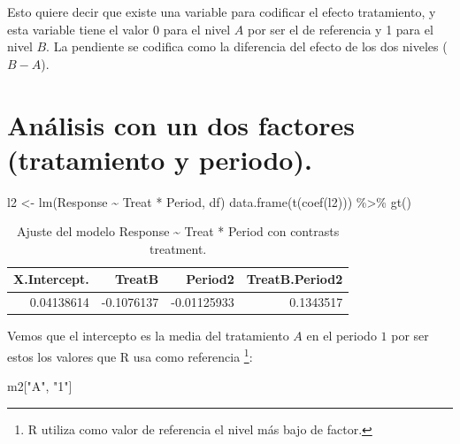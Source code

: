 \documentclass[
  12pt,
  a4paper,
  extrafontsizes,
  onecolumn,
  openright]{memoir}
\newenvironment{Shaded}{\begin{snugshade}}{\end{snugshade}}
\newcommand{\FunctionTok}[1]{\textcolor[rgb]{0.28,0.35,0.67}{#1}}
\newcommand{\NormalTok}[1]{\textcolor[rgb]{0.00,0.23,0.31}{#1}}
\newcommand{\OtherTok}[1]{\textcolor[rgb]{0.00,0.23,0.31}{#1}}
\newcommand{\SpecialCharTok}[1]{\textcolor[rgb]{0.37,0.37,0.37}{#1}}
\newcommand{\StringTok}[1]{\textcolor[rgb]{0.13,0.47,0.30}{#1}}
\begin{document}
Esto quiere decir que existe una variable para codificar el efecto
tratamiento, y esta variable tiene el valor 0 para el nivel \(A\) por
ser el de referencia y 1 para el nivel \(B\). La pendiente se codifica
como la diferencia del efecto de los dos niveles (\(B - A\)).

\hypertarget{anuxe1lisis-con-un-dos-factores-tratamiento-y-periodo.}{%
\section{Análisis con un dos factores (tratamiento y
periodo).}\label{anuxe1lisis-con-un-dos-factores-tratamiento-y-periodo.}}

\scriptsize

\begin{Shaded}
\begin{Highlighting}[]
\NormalTok{l2 }\OtherTok{\textless{}{-}} \FunctionTok{lm}\NormalTok{(Response }\SpecialCharTok{\textasciitilde{}}\NormalTok{ Treat }\SpecialCharTok{*}\NormalTok{ Period, df)}
\FunctionTok{data.frame}\NormalTok{(}\FunctionTok{t}\NormalTok{(}\FunctionTok{coef}\NormalTok{(l2))) }\SpecialCharTok{\%\textgreater{}\%} \FunctionTok{gt}\NormalTok{()}
\end{Highlighting}
\end{Shaded}

\hypertarget{tbl-l2}{}
\begin{longtable}{rrrr}
\caption{\label{tbl-l2}Ajuste del modelo Response \textasciitilde{} Treat * Period con
contrasts treatment. }\tabularnewline

\toprule
X.Intercept. & TreatB & Period2 & TreatB.Period2 \\ 
\midrule
0.04138614 & -0.1076137 & -0.01125933 & 0.1343517 \\ 
\bottomrule
\end{longtable}

\normalsize

Vemos que el intercepto es la media del tratamiento \(A\) en el periodo
\(1\) por ser estos los valores que R usa como referencia \footnote{R
  utiliza como valor de referencia el nivel más bajo de factor.}:

\scriptsize

\begin{Shaded}
\begin{Highlighting}[]
\NormalTok{m2[}\StringTok{"A"}\NormalTok{, }\StringTok{"1"}\NormalTok{]}
\end{Highlighting}
\end{Shaded}
\end{document}
